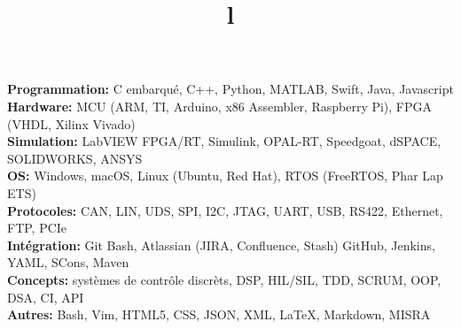 \documentclass[mm]{res}
\begin{document}



\begin{resume}

\npspctoprule
\section{\headingskills}
\tb \textbf{Programmation:} C embarqu\'e, C++, Python, MATLAB, Swift, Java, Javascript\\
\tb \textbf{Hardware:} MCU (ARM, TI, Arduino, x86 Assembler, Raspberry Pi), FPGA (VHDL, Xilinx Vivado)\\
\tb \textbf{Simulation:} LabVIEW FPGA/RT, Simulink, OPAL-RT, Speedgoat, dSPACE, SOLIDWORKS, ANSYS\\
\tb \textbf{OS:} Windows, macOS, Linux (Ubuntu, Red Hat), RTOS (FreeRTOS, Phar Lap ETS)\\
\tb \textbf{Protocoles:} CAN, LIN, UDS, SPI, I2C, JTAG, UART, USB, RS422, Ethernet, FTP, PCIe\\
\tb \textbf{Int\'egration:} Git Bash, Atlassian (JIRA, Confluence, Stash) GitHub, Jenkins, YAML, SCons, Maven\\
\tb \textbf{Concepts:} syst\`emes de contr\^ole discr\`ets, DSP, HIL/SIL, TDD, SCRUM, OOP, DSA, CI, API\\
\tb \textbf{Autres:} Bash, Vim, HTML5, CSS, JSON, XML, \LaTeX, Markdown, MISRA\xspace


\toprule

\section{\headingeducation}
\begin{format}
\\
\title{l}\\
\end{format}  


\end{resume}
\end{document}
